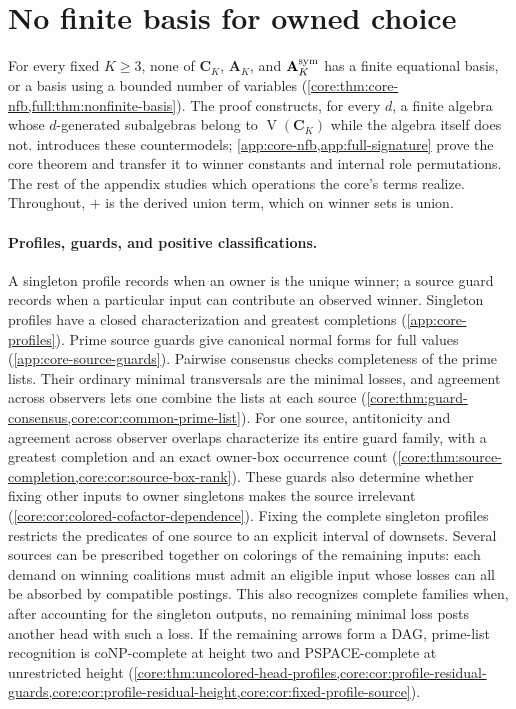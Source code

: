 \section{No finite basis for owned choice}\label{app:core-basis}

For every fixed $K\geq3$, none of $\mathbf C_K$, $\mathbf A_K$,
and $\mathbf A_K^{\rm sym}$ has a finite equational basis, or a basis
using a bounded number of variables
(\cref{core:thm:core-nfb,full:thm:nonfinite-basis}). The proof constructs,
for every $d$, a finite algebra whose $d$-generated subalgebras belong to
$\operatorname V(\mathbf C_K)$ while the algebra itself does not.
 introduces these countermodels;
\cref{app:core-nfb,app:full-signature} prove the core theorem and transfer
it to winner constants and internal role permutations. The rest of the
appendix studies which operations the core's terms realize. Throughout,
$+$ is the derived union term, which on winner sets is union.

\paragraph{Profiles, guards, and positive classifications.}
A singleton profile records when an owner is the unique winner; a source
guard records when a particular input can contribute an observed winner.
Singleton profiles have a closed characterization and greatest completions
(\cref{app:core-profiles}). Prime source guards give canonical normal
forms for full values (\cref{app:core-source-guards}). Pairwise consensus
checks completeness of the prime lists. Their ordinary minimal
transversals are the minimal losses, and agreement across observers lets
one combine the lists at each source
(\cref{core:thm:guard-consensus,core:cor:common-prime-list}). For one source,
antitonicity and agreement across observer overlaps characterize its
entire guard family, with a greatest completion and an exact owner-box
occurrence count
(\cref{core:thm:source-completion,core:cor:source-box-rank}). These guards
also determine whether fixing other inputs to owner singletons makes the
source irrelevant (\cref{core:cor:colored-cofactor-dependence}).
Fixing the complete singleton profiles restricts the predicates of one
source to an explicit interval of downsets. Several sources can be
prescribed together on colorings of the remaining inputs: each demand on
winning coalitions must admit an eligible input whose losses can all
be absorbed by compatible postings. This also recognizes complete
families when, after accounting for the singleton outputs, no remaining
minimal loss posts another head with such a loss. If the remaining
arrows form a DAG, prime-list recognition is coNP-complete at height
two and PSPACE-complete at unrestricted height
(\cref{core:thm:uncolored-head-profiles,core:cor:profile-residual-guards,core:cor:profile-residual-height,core:cor:fixed-profile-source}).

